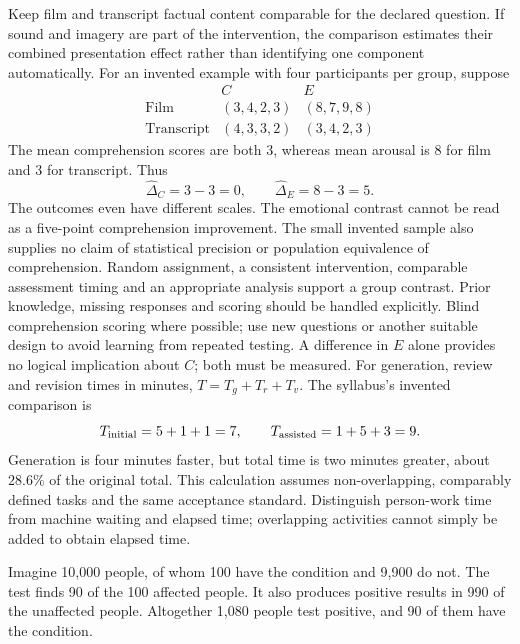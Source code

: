 Keep film and transcript factual content comparable for the declared question. If sound and imagery are part of the intervention, the comparison estimates their combined presentation effect rather than identifying one component automatically.
For an invented example with four participants per group, suppose
\[
\begin{array}{c|cc}
& C & E\\\hline
\text{Film}&(3,4,2,3)&(8,7,9,8)\\
\text{Transcript}&(4,3,3,2)&(3,4,2,3)
\end{array}
\]
The mean comprehension scores are both $3$, whereas mean arousal is $8$ for film and $3$ for transcript. Thus
\[
\widehat\Delta_C=3-3=0,\qquad
\widehat\Delta_E=8-3=5.
\]
The outcomes even have different scales. The emotional contrast cannot be read as a five-point comprehension improvement. The small invented sample also supplies no claim of statistical precision or population equivalence of comprehension.
Random assignment, a consistent intervention, comparable assessment timing and an appropriate analysis support a group contrast. Prior knowledge, missing responses and scoring should be handled explicitly. Blind comprehension scoring where possible; use new questions or another suitable design to avoid learning from repeated testing. A difference in $E$ alone provides no logical implication about $C$; both must be measured.
For generation, review and revision times in minutes, $T=T_g+T_r+T_v$. The syllabus's invented comparison is
\[
T_{\rm initial}=5+1+1=7,\qquad
T_{\rm assisted}=1+5+3=9.
\]
Generation is four minutes faster, but total time is two minutes greater, about $28.6\%$ of the original total. This calculation assumes non-overlapping, comparably defined tasks and the same acceptance standard. Distinguish person-work time from machine waiting and elapsed time; overlapping activities cannot simply be added to obtain elapsed time.

\biomedicalanswer
{}
Imagine 10,000 people, of whom 100 have the condition and 9,900 do not. The test finds 90 of the 100 affected people. It also produces positive results in 990 of the unaffected people. Altogether 1,080 people test positive, and 90 of them have the condition.

